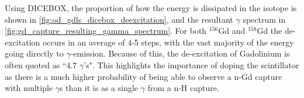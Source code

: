 \par
Using DICEBOX, the proportion of how the energy is dissipated in the isotope is shown in \autoref{fig:od_gdls_dicebox_deexcitation}, and the resultant $\gamma$ spectrum in \autoref{fig:gd_capture_resulting_gamma_spectrum}.
For both ${}^{156}$Gd and ${}^{158}$Gd the de-excitation occurs in an average of 4-5 steps, with the vast majority of the energy going directly to $\gamma$-emission.
Because of this, the de-excitation of Gadolinium is often quoted as ``4.7 $\gamma$'s".
This highlights the importance of doping the scintillator as there is a much higher probability of being able to observe a n-Gd capture with multiple $\gamma$s than it is as a single $\gamma$ from a n-H capture.




